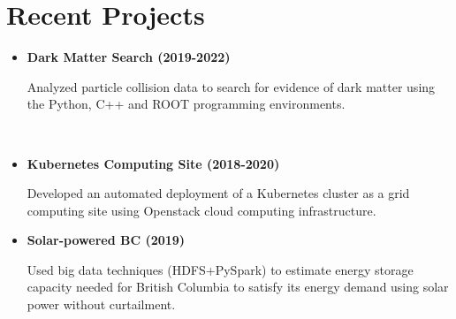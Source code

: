 \vspace{0.5em}
\section{Recent Projects}


\begin{minipage}[t]{0.48\textwidth}

\begin{itemize}
\item \textbf{Dark Matter Search (2019-2022)}

Analyzed particle collision data to search for evidence of dark matter using the Python, C++ and ROOT programming environments.

\end{itemize}

\end{minipage}
\hfill\
\begin{minipage}[t]{0.48\textwidth}

\begin{itemize}
\item \textbf{Kubernetes Computing Site (2018-2020)}

Developed an automated deployment of a Kubernetes cluster as a grid computing site using Openstack cloud computing infrastructure.

\end{itemize}
\vspace{0.5em}
\end{minipage}
\begin{minipage}[t]{0.48\textwidth}

\begin{itemize}
\item \textbf{Solar-powered BC (2019)}

Used big data techniques (HDFS+PySpark) to estimate energy storage capacity needed for British Columbia to satisfy its energy demand using solar power without curtailment.

\end{itemize}
\end{minipage}

